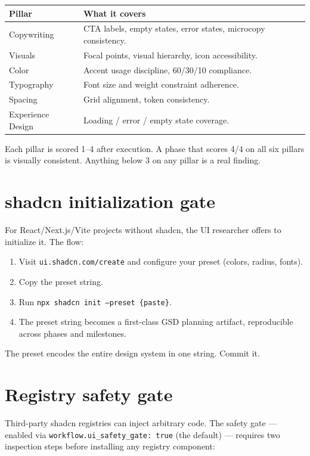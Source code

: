 \documentclass[11pt,letterpaper,openany]{book}
\begin{document}
\begin{tabularx}{\textwidth}{l X}
\toprule
\textbf{Pillar} & \textbf{What it covers} \\
\midrule
Copywriting & CTA labels, empty states, error states, microcopy consistency. \\
Visuals & Focal points, visual hierarchy, icon accessibility. \\
Color & Accent usage discipline, 60/30/10 compliance. \\
Typography & Font size and weight constraint adherence. \\
Spacing & Grid alignment, token consistency. \\
Experience Design & Loading / error / empty state coverage. \\
\bottomrule
\end{tabularx}

Each pillar is scored 1--4 after execution. A phase that scores 4/4 on all six pillars is visually consistent. Anything below 3 on any pillar is a real finding.

\section{shadcn initialization gate}

For React/Next.js/Vite projects without shadcn, the UI researcher offers to initialize it. The flow:

\begin{enumerate}[itemsep=2pt]
  \item Visit \texttt{ui.shadcn.com/create} and configure your preset (colors, radius, fonts).
  \item Copy the preset string.
  \item Run \texttt{npx shadcn init --preset \{paste\}}.
  \item The preset string becomes a first-class GSD planning artifact, reproducible across phases and milestones.
\end{enumerate}

The preset encodes the entire design system in one string. Commit it.

\section{Registry safety gate}

Third-party shadcn registries can inject arbitrary code. The safety gate --- enabled via \texttt{workflow.ui\_safety\_gate: true} (the default) --- requires two inspection steps before installing any registry component:
\end{document}
